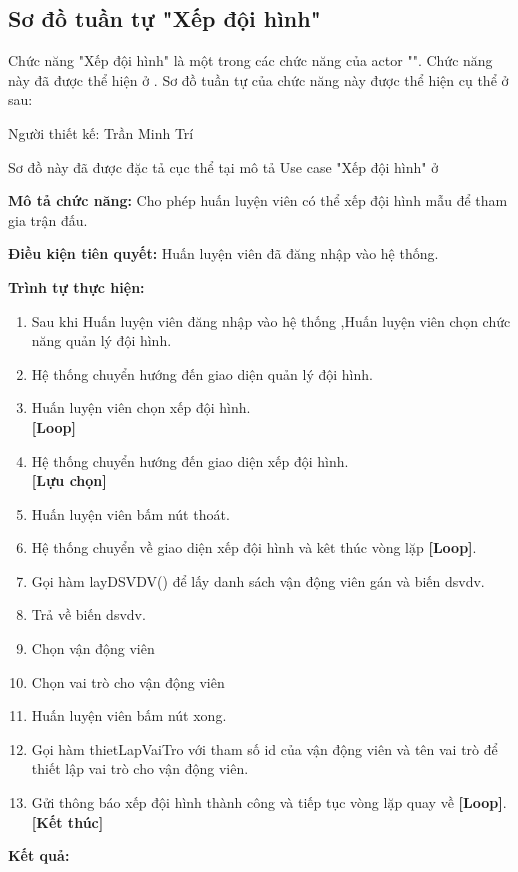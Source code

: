 \subsection{Sơ đồ tuần tự "Xếp đội hình"}
\setcounter{figure}{0}

Chức năng "Xếp đội hình" là một trong các chức năng của actor "".
Chức năng này đã được thể hiện ở \myref{}.
Sơ đồ tuần tự của chức năng này được thể hiện cụ thể ở \myref{} sau:

Người thiết kế: Trần Minh Trí

Sơ đồ này đã được đặc tả cục thể tại mô tả Use case
"Xếp đội hình" ở 

\noindent
\textbf{Mô tả chức năng:} Cho phép huấn luyện viên có thể xếp đội hình mẫu để tham gia trận đấu.

\noindent
\textbf{Điều kiện tiên quyết:} Huấn luyện viên đã đăng nhập vào hệ thống.

\noindent
\textbf{Trình tự thực hiện:}

\noindent
\begin{enumerate}
      \item Sau khi Huấn luyện viên đăng nhập vào hệ thống ,Huấn luyện viên chọn chức năng quản lý đội hình.
      \item Hệ thống chuyển hướng đến giao diện quản lý đội hình.
      \item Huấn luyện viên chọn xếp đội hình.
            \\\textbf{[Loop]}
      \item Hệ thống chuyển hướng đến giao diện xếp đội hình.
            \\\textbf{[Lựu chọn]}
      \item Huấn luyện viên bấm nút thoát.
      \item Hệ thống chuyển về giao diện xếp đội hình và kêt thúc vòng lặp \textbf{[Loop]}.
      \item Gọi hàm layDSVDV() để lấy danh sách vận động viên gán và biến dsvdv.
      \item Trả về biến dsvdv.
      \item Chọn vận động viên
      \item Chọn vai trò cho vận động viên
      \item Huấn luyện viên bấm nút xong.
      \item Gọi hàm thietLapVaiTro với tham số id của vận động viên và tên vai trò để thiết lập vai trò cho vận động viên.
      \item Gửi thông báo xếp đội hình thành công và tiếp tục vòng lặp quay về \textbf{[Loop]}.
            \\\textbf{[Kết thúc]}
\end{enumerate}

\noindent
\textbf{Kết quả:}

